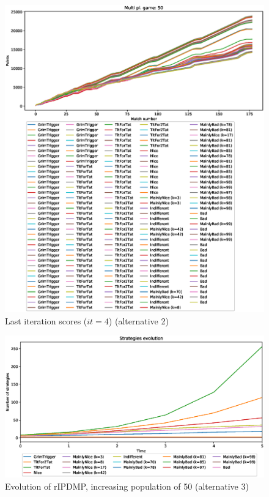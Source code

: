 \documentclass[journal,10pt,twoside]{IEEEtran}
\begin{document}
\begin{figure}[!ht]
    \centering
    \includegraphics[width=1\columnwidth]{../img/ripdmp-incr/alt2/ripdmp-scores-increasing-pop-50-r4}
    \caption{Last iteration scores ($it=4$) (alternative 2)}
    \label{fig:incrLIa2}
\end{figure}

\begin{figure}[!ht]
    \centering
    \includegraphics[width=1\columnwidth]{../img/ripdmp-incr/alt3/ripdmp-evolution-increasing-pop-50}
    \caption{Evolution of rIPDMP, increasing population of 50 (alternative 3)}
    \label{fig:incrRa3}
\end{figure}
\end{document}

